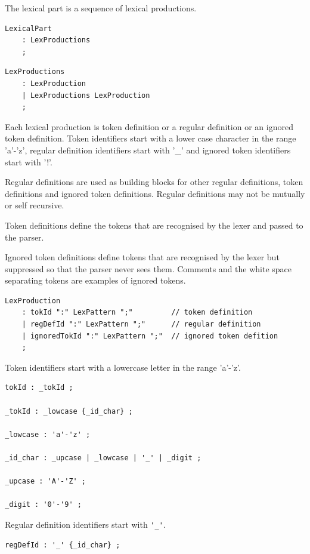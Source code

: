 \documentclass[12pt]{article}
\begin{document}
The lexical part is a sequence of lexical productions.

\begin{Verbatim}[frame=single]
LexicalPart
    : LexProductions
    ;
\end{Verbatim}

\begin{Verbatim}[frame=single]
LexProductions
    : LexProduction
    | LexProductions LexProduction
    ;
\end{Verbatim}

Each lexical production is token definition or a regular definition or an ignored token definition. Token identifiers start with a lower case character in the range 'a'-'z', regular definition identifiers start with '\_' and ignored token identifiers start with '!'.

Regular definitions are used as building blocks for other regular definitions, token definitions and ignored token definitions. Regular definitions may not be mutually or self recursive.

Token definitions define the tokens that are recognised by the lexer and passed to the parser.

Ignored token definitions define tokens that are recognised by the lexer but suppressed so that the parser never sees them. Comments and the white space separating tokens are examples of ignored tokens.

\begin{Verbatim}[frame=single]
LexProduction
    : tokId ":" LexPattern ";"         // token definition
    | regDefId ":" LexPattern ";"      // regular definition
    | ignoredTokId ":" LexPattern ";"  // ignored token defition
    ;
\end{Verbatim}

Token identifiers start with a lowercase letter in the range 'a'-'z'.

\begin{Verbatim}[frame=single]
tokId : _tokId ;

_tokId : _lowcase {_id_char} ;

_lowcase : 'a'-'z' ;

_id_char : _upcase | _lowcase | '_' | _digit ;

_upcase : 'A'-'Z' ;

_digit : '0'-'9' ;
\end{Verbatim}

Regular definition identifiers start with \verb|'_'|.

\begin{Verbatim}[frame=single]
regDefId : '_' {_id_char} ;
\end{Verbatim}
\end{document}
